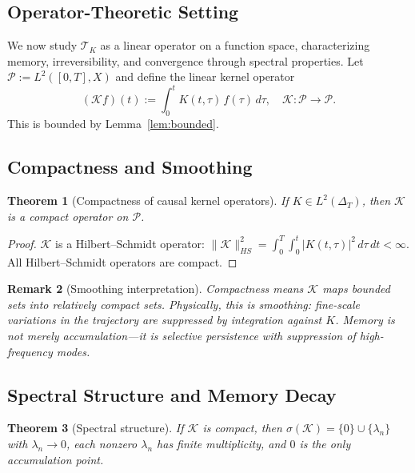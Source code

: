 \documentclass[12pt]{article}
\newtheorem{theorem}{Theorem}[section]
\newtheorem{remark}[theorem]{Remark}
\newcommand{\Pcal}{\mathcal{P}}
\newcommand{\TK}{\mathcal{T}_K}
\begin{document}
\subsection{Operator-Theoretic Setting}

We now study $\TK$ as a linear operator on a function space, characterizing
memory, irreversibility, and convergence through spectral properties.
Let $\Pcal := L^2([0,T], X)$ and define the linear kernel operator
\[
  (\mathcal{K}f)(t) := \int_0^t K(t,\tau)\,f(\tau)\,d\tau,
  \quad \mathcal{K} \colon \Pcal \to \Pcal.
\]
This is bounded by Lemma~\ref{lem:bounded}.

\subsection{Compactness and Smoothing}

\begin{theorem}[Compactness of causal kernel operators]
\label{thm:compact}
If $K \in L^2(\Delta_T)$, then $\mathcal{K}$ is a compact operator on $\Pcal$.
\end{theorem}

\begin{proof}
$\mathcal{K}$ is a Hilbert--Schmidt operator:
$\|\mathcal{K}\|_{HS}^2 = \int_0^T\!\int_0^t|K(t,\tau)|^2\,d\tau\,dt < \infty$.
All Hilbert--Schmidt operators are compact.
\end{proof}

\begin{remark}[Smoothing interpretation]
Compactness means $\mathcal{K}$ maps bounded sets into relatively compact
sets. Physically, this is \emph{smoothing}: fine-scale variations in the
trajectory are suppressed by integration against $K$. Memory is not merely
accumulation---it is selective persistence with suppression of high-frequency
modes.
\end{remark}

\subsection{Spectral Structure and Memory Decay}

\begin{theorem}[Spectral structure]
\label{thm:spectrum}
If $\mathcal{K}$ is compact, then $\sigma(\mathcal{K}) = \{0\}\cup\{\lambda_n\}$
with $\lambda_n \to 0$, each nonzero $\lambda_n$ has finite multiplicity, and
$0$ is the only accumulation point.
\end{theorem}
\end{document}
